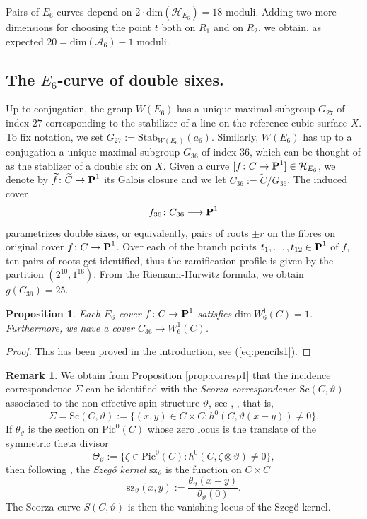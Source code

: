 \documentclass[11pt]{amsart}
\newtheorem{proposition}[theorem]{Proposition}
\theoremstyle{definition}
\newtheorem{remark}[theorem]{Remark}
\def\PP{{\textbf P}}
\def\cA{\mathcal{A}}
\def\cH{\mathcal{H}}
\begin{document}
Pairs of $E_6$-curves depend on $2\cdot \mbox{dim}(\cH_{E_6})=18$ moduli. Adding two more dimensions for choosing the point $t$ both on $R_1$ and on $R_2$, we obtain, as expected $20=\mbox{dim}(\cA_6)-1$ moduli. 




\subsection{The $E_6$-curve of double sixes.}
Up to conjugation, the group $W(E_6)$ has a unique maximal subgroup $G_{27}$ of index $27$ corresponding to the stabilizer of a line on the reference cubic surface $X$. To fix notation, we set $G_{27}:=\mbox{Stab}_{W(E_6)}(a_6)$. Similarly, $W(E_6)$ has up to a conjugation a unique maximal subgroup $G_{36}$ of index $36$, which can be thought of as the stablizer of a double six on $X$.  Given a curve $[f\colon C\rightarrow \PP^1]\in \cH_{E_6}$, we denote by $\widetilde{f}\colon \widetilde{C}\rightarrow \PP^1$ its Galois closure and we let $C_{36}:=\widetilde{C}/G_{36}$. The induced cover 
\begin{equation}\label{eq:double-sixers}
f_{36}\colon C_{36}\longrightarrow \PP^1
\end{equation}
parametrizes double sixes, or equivalently, pairs of roots $\pm r$  on the fibres on original cover $f\colon C\rightarrow \PP^1$. Over each of the branch points $t_1, \ldots, t_{12}\in \PP^1$ of $f$,  ten pairs of roots get identified, thus the ramification profile is given by the partition $(2^{10}, 1^{16})$. From the Riemann-Hurwitz formula, we obtain  $g(C_{36})=25$.

\begin{proposition}\label{eq:aprodu-cond}
Each $E_6$-cover $f\colon C\rightarrow \PP^1$ satisfies $\mathrm{dim}\ W^1_6(C)=1$. Furthermore, we have a cover $C_{36}\rightarrow W^1_6(C)$.
\end{proposition}
\begin{proof}
This has been proved in the introduction, see (\ref{eq:pencils1}).    
\end{proof}


\begin{remark}\label{rmk:scorza} We obtain from Proposition \ref{prop:corresp1} that the incidence correspondence $\Sigma$ can be identified with the \emph{Scorza correspondence} $\mbox{Sc}(C,\vartheta)$ associated to the non-effective spin structure $\vartheta$, see \cite{DK}, \cite{FI}, that is,
$$\Sigma=\mathrm{Sc}(C,\vartheta):=\bigl\{(x,y)\in C\times C: h^0(C, \vartheta(x-y))\neq 0\bigr\}.$$ If $\theta_{\vartheta}$ is the section on  $\mbox{Pic}^0(C)$ whose zero locus is the translate of the symmetric theta divisor
$$\Theta_{\vartheta}:=\bigl\{\zeta\in \mbox{Pic}^0(C): h^0(C, \zeta\otimes \vartheta)\neq 0\bigr\},$$ then following \cite{FI}, the \emph{Szeg\H{o} kernel} $\mathrm{sz}_{\vartheta}$ is the function on $C\times C$
\begin{equation}\label{eq:szego}
\mathrm{sz}_{\vartheta}(x,y):=\frac{\theta_{\vartheta}(x-y)}{\theta_{\vartheta}(0)}.
\end{equation} The Scorza curve $S(C,\vartheta)$ is then  the vanishing locus of the Szeg\H{o} kernel.
\end{remark}
\end{document}
